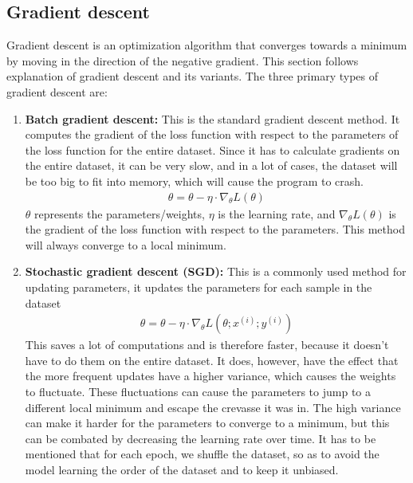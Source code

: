 \documentclass[a4paper,12pt]{article}
\begin{document}
\subsection{Gradient descent}
Gradient descent is an optimization algorithm that converges towards a minimum by moving in the direction of the negative gradient. This section follows \cite{ruder2016overview} explanation of gradient descent and its variants.
The three primary types of gradient descent are:
\begin{enumerate}
\item \textbf{Batch gradient descent:}
This is the standard gradient descent method. It computes the gradient of the loss function with respect to the parameters of the loss function for the entire dataset.
Since it has to calculate gradients on the entire dataset, it can be very slow, and in a lot of cases, the dataset will be too big to fit into memory, which will cause the program to crash.
\begin{align}
\theta = \theta - \eta \cdot \nabla_\theta L(\theta)
\end{align}
$\theta$ represents the parameters/weights, $\eta$ is the learning rate, and $\nabla_\theta L(\theta)$ is the gradient of the loss function with respect to the parameters.
This method will always converge to a local minimum.




\item \textbf{Stochastic gradient descent (SGD):}
This is a commonly used method for updating parameters, it updates the parameters for each sample in the dataset
\begin{align}
\theta = \theta - \eta \cdot \nabla_\theta L(\theta; x^{(i)}; y^{(i)})
\end{align}
This saves a lot of computations and is therefore faster, because it doesn't have to do them on the entire dataset. It does, however, have the effect that the more frequent updates have a higher variance, which causes the weights to fluctuate.
These fluctuations can cause the parameters to jump to a different local minimum and escape the crevasse it was in. The high variance can make it harder for the parameters to converge to a minimum, but this can be combated by decreasing the learning rate over time. It has to be mentioned that for each epoch, we shuffle the dataset, so as to avoid the model learning the order of the dataset and to keep it unbiased.





\end{enumerate}
\end{document}
